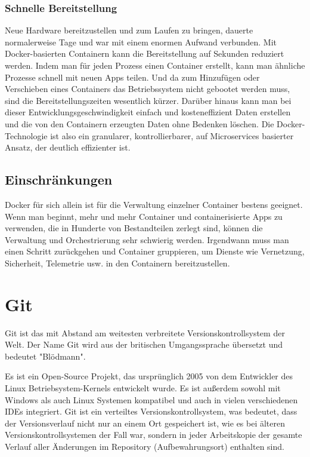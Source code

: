 \subsubsection{Schnelle Bereitstellung}

Neue Hardware bereitzustellen und zum Laufen zu bringen, dauerte normalerweise Tage und war mit einem enormen Aufwand verbunden. Mit Docker-basierten Containern kann die Bereitstellung auf Sekunden reduziert werden. 
Indem man für jeden Prozess einen Container erstellt, kann man ähnliche Prozesse schnell mit neuen Apps teilen. Und da zum Hinzufügen oder Verschieben eines Containers das 
Betriebssystem nicht gebootet werden muss, sind die Bereitstellungszeiten wesentlich kürzer. Darüber hinaus kann man bei dieser Entwicklungsgeschwindigkeit 
einfach und kosteneffizient Daten erstellen und die von den Containern erzeugten Daten ohne Bedenken löschen.
Die Docker-Technologie ist also ein granularer, kontrollierbarer, auf Microservices basierter Ansatz, der deutlich effizienter ist.
\cite{sysarch-docker-1}

\subsection{Einschränkungen}

Docker für sich allein ist für die Verwaltung einzelner Container bestens geeignet. Wenn man beginnt, mehr und mehr Container und containerisierte Apps zu verwenden, 
die in Hunderte von Bestandteilen zerlegt sind, können die Verwaltung und Orchestrierung sehr schwierig werden. Irgendwann muss man einen Schritt zurückgehen und Container gruppieren, 
um Dienste wie Vernetzung, Sicherheit, Telemetrie usw. in den Containern bereitzustellen.
\cite{sysarch-docker-1}

\section{Git}

Git ist das mit Abstand am weitesten verbreitete Versionskontrollsystem der Welt. Der Name Git wird aus der britischen 
Umgangssprache übersetzt und bedeutet "Blödmann".
\cite{sysarch-git-1}

Es ist ein Open-Source Projekt, 
das ursprünglich 2005 von dem Entwickler des Linux Betriebsystem-Kernels entwickelt wurde. Es ist außerdem sowohl mit 
Windows als auch Linux Systemen kompatibel und auch in vielen verschiedenen IDEs integriert. Git ist ein verteiltes Versionskontrollsystem, 
was bedeutet, dass der Versionsverlauf nicht nur an einem Ort gespeichert ist, wie es bei älteren Versionskontrollsystemen der Fall war, 
sondern in jeder Arbeitskopie der gesamte Verlauf aller Änderungen im Repository (Aufbewahrungsort) enthalten sind. 
\cite{sysarch-git-2}

